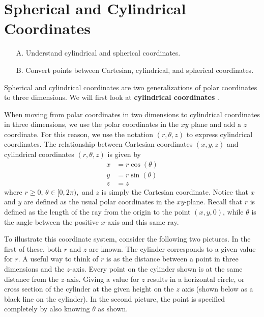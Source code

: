 \section{Spherical and Cylindrical Coordinates}

\begin{outcome}
\begin{enumerate}
\item[A.]  Understand cylindrical and spherical coordinates.

\item[B.]  Convert points between Cartesian, cylindrical, and spherical coordinates.
\end{enumerate}
\end{outcome}

Spherical and cylindrical coordinates are two generalizations of polar coordinates to three dimensions. We will first look at \textbf{cylindrical coordinates} .

When moving from polar coordinates in two dimensions to cylindrical coordinates in three dimensions, we use the polar coordinates in the $xy$
plane and add a $z$ coordinate. For this reason, we use the notation $(r, \theta, z)$ to express cylindrical coordinates.
The relationship between Cartesian coordinates $(x,y,z)$ and cylindrical coordinates $(r, \theta, z)$ is given by  
\begin{align*}
x& =r\cos \left( \theta \right)  \\
y& =r\sin \left( \theta \right)  \\
z& =z
\end{align*}
where $r\geq 0$, $\theta \in \lbrack 0,2\pi ),$ and $z$ is simply the Cartesian
coordinate. Notice that $x$ and $y$ are defined as the usual polar coordinates in the $xy$-plane. Recall that $r$ is defined as the length of the ray from the origin to the point $(x,y,0)$, while $\theta$ is the angle between the positive $x$-axis and this same ray. 

To illustrate this coordinate system, consider the following two pictures.
In the first of these, both $r$ and $z$ are known. The cylinder corresponds to a given value for $r$. A useful way to think of $r$ is
as the distance between a point in three dimensions and the $z$-axis. Every point on the cylinder shown is at the same distance from the $z$-axis. Giving a value for $z$ results in a horizontal circle, or cross section of the cylinder at the given height on the $z$ axis (shown below as a black line on the cylinder). In the second picture, the point is specified completely by also knowing $\theta$ as shown.

